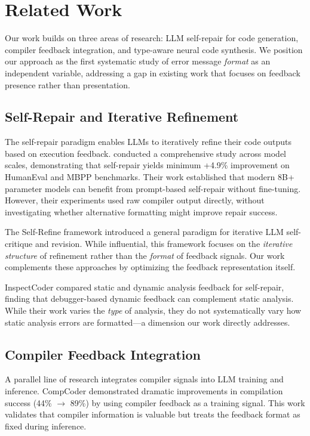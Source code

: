\section{Related Work}

Our work builds on three areas of research: LLM self-repair for code generation, compiler feedback integration, and type-aware neural code synthesis. We position our approach as the first systematic study of error message \emph{format} as an independent variable, addressing a gap in existing work that focuses on feedback presence rather than presentation.

\subsection{Self-Repair and Iterative Refinement}

The self-repair paradigm enables LLMs to iteratively refine their code outputs based on execution feedback. \citet{chen2024selfrepair} conducted a comprehensive study across model scales, demonstrating that self-repair yields minimum +4.9\% improvement on HumanEval and MBPP benchmarks. Their work established that modern 8B+ parameter models can benefit from prompt-based self-repair without fine-tuning. However, their experiments used raw compiler output directly, without investigating whether alternative formatting might improve repair success.

The Self-Refine framework \citep{madaan2023selfrefine} introduced a general paradigm for iterative LLM self-critique and revision. While influential, this framework focuses on the \emph{iterative structure} of refinement rather than the \emph{format} of feedback signals. Our work complements these approaches by optimizing the feedback representation itself.

InspectCoder \citep{inspectcoder2025} compared static and dynamic analysis feedback for self-repair, finding that debugger-based dynamic feedback can complement static analysis. While their work varies the \emph{type} of analysis, they do not systematically vary how static analysis errors are formatted---a dimension our work directly addresses.

\subsection{Compiler Feedback Integration}

A parallel line of research integrates compiler signals into LLM training and inference. CompCoder \citep{compilerfeedback2024} demonstrated dramatic improvements in compilation success (44\% $\rightarrow$ 89\%) by using compiler feedback as a training signal. This work validates that compiler information is valuable but treats the feedback format as fixed during inference.

